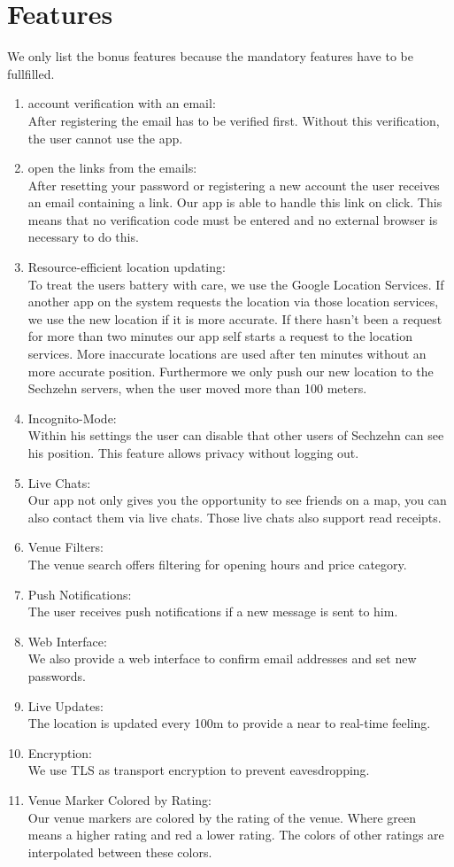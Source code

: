 \documentclass[11pt, accentcolor=tud1c]{tudreport}
\begin{document}
\section{Features}\label{sec:features}
We only list the bonus features because the mandatory features have to be fullfilled.
\begin{enumerate}
\item account verification with an email: \\
After registering the email has to be verified first. Without this verification, the user cannot use the app.
\item open the links from the emails: \\
After resetting your password or registering a new account the user receives an email containing a link. Our app is able to handle this link on click. This means that no verification code must be entered and no external browser is necessary to do this.
\item Resource-efficient location updating: \\
To treat the users battery with care, we use the Google Location Services. If another app on the system requests the location via those location services, we use the new location if it is more accurate. If there hasn't been a request for more than two minutes our app self starts a request to the location services. More inaccurate locations are used after ten minutes without an more accurate position. Furthermore we only push our new location to the Sechzehn servers, when the user moved more than 100 meters. 
\item Incognito-Mode: \\
Within his settings the user can disable that other users of Sechzehn can see his position. This feature allows privacy without logging out.
\item Live Chats: \\
Our app not only gives you the opportunity to see friends on a map, you can also contact them via live chats. Those live chats also support read receipts.
\item Venue Filters: \\
The venue search offers filtering for opening hours and price category.
\item Push Notifications: \\
The user receives push notifications if a new message is sent to him.
\item Web Interface: \\
We also provide a web interface to confirm email addresses and set new passwords.
\item Live Updates: \\
The location is updated every 100m to provide a near to real-time feeling.
\item Encryption: \\
We use TLS as transport encryption to prevent eavesdropping.
\item Venue Marker Colored by Rating:\\
Our venue markers are colored by the rating of the venue. Where green means a higher rating and red a lower rating. The colors of other ratings are interpolated between these colors.
\end{enumerate}
\end{document}
